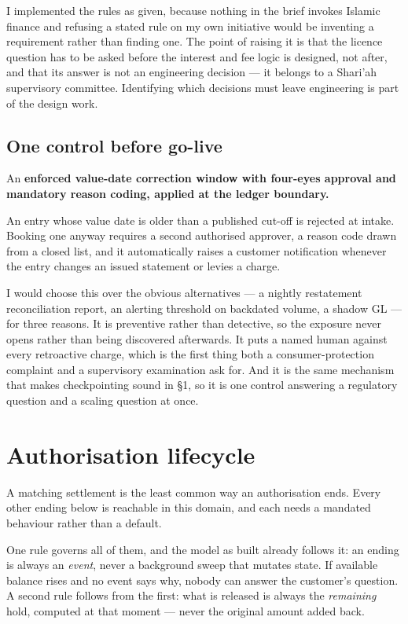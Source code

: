 \documentclass[10pt,a4paper]{article}
\newcommand{\term}[1]{\textit{#1}}
\begin{document}
I implemented the rules as given, because nothing in the brief invokes Islamic
finance and refusing a stated rule on my own initiative would be inventing a
requirement rather than finding one. The point of raising it is that the
licence question has to be asked before the interest and fee logic is designed,
not after, and that its answer is not an engineering decision --- it belongs to
a Shari'ah supervisory committee. Identifying which decisions must leave
engineering is part of the design work.

\subsection{One control before go-live}

An \textbf{enforced value-date correction window with four-eyes approval and
mandatory reason coding, applied at the ledger boundary.}

An entry whose value date is older than a published cut-off is rejected at
intake. Booking one anyway requires a second authorised approver, a reason code
drawn from a closed list, and it automatically raises a customer notification
whenever the entry changes an issued statement or levies a charge.

I would choose this over the obvious alternatives --- a nightly restatement
reconciliation report, an alerting threshold on backdated volume, a shadow GL
--- for three reasons. It is preventive rather than detective, so the exposure
never opens rather than being discovered afterwards. It puts a named human
against every retroactive charge, which is the first thing both a
consumer-protection complaint and a supervisory examination ask for. And it is
the same mechanism that makes checkpointing sound in \S1, so it is one control
answering a regulatory question and a scaling question at once.

\section{Authorisation lifecycle}

A matching settlement is the least common way an authorisation ends. Every
other ending below is reachable in this domain, and each needs a mandated
behaviour rather than a default.

One rule governs all of them, and the model as built already follows it: an
ending is always an \term{event}, never a background sweep that mutates state.
If available balance rises and no event says why, nobody can answer the
customer's question. A second rule follows from the first: what is released is
always the \term{remaining} hold, computed at that moment --- never the
original amount added back.
\end{document}
